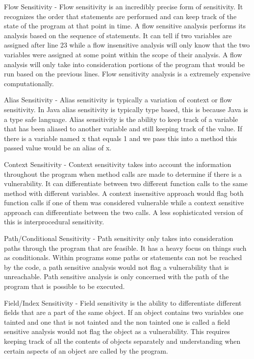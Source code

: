 Flow Sensitivity - Flow sensitivity is an incredibly precise form of sensitivity. It recognizes the order that statements are performed and can keep track of the state of the program at that point in time. A flow sensitive analysis performs its analysis based on the sequence of statements. It can tell if two variables are assigned after line 23 while a flow insensitive analysis will only know that the two variables were assigned at some point within the scope of their analysis. A flow analysis will only take into consideration portions of the program that would be run based on the previous lines. Flow sensitivity analysis is a extremely expensive computationally.

Alias Sensitivity - Alias sensitivity is typically a variation of context or flow sensitivity. In Java alias sensitivity is typically type based, this is because Java is a type safe language. Alias sensitivity is the ability to keep track of a variable that has been aliased to another variable and still keeping track of the value. If there is a variable named x that equals 1 and we pass this into a method this passed value would be an alias of x.

Context Sensitivity - Context sensitivity takes into account the information throughout the program when method calls are made to determine if there is a vulnerability. It can differentiate between two different function calls to the same method with different variables. A context insensitive approach would flag both function calls if one of them was considered vulnerable while a context sensitive approach can differentiate between the two calls. A less sophisticated version of this is interprocedural sensitivity.

Path/Conditional Sensitivity - Path sensitivity only takes into consideration paths through the program that are feasible. It has a heavy focus on things such as conditionals. Within programs some paths or statements can not be reached by the code, a path sensitive analysis would not flag a vulnerability that is unreachable. Path sensitive analysis is only concerned with the path of the program that is possible to be executed.

Field/Index Sensitivity - Field sensitivity is the ability to differentiate different fields that are a part of the same object. If an object contains two variables one tainted and one that is not tainted and the non tainted one is called a field sensitive analysis would not flag the object as a vulnerability. This requires keeping track of all the contents of objects separately and understanding when certain aspects of an object are called by the program.
    
